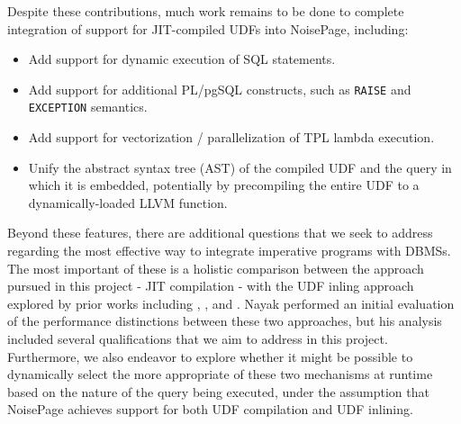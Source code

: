 \documentclass{vldb}
\def\code#1{\texttt{#1}}
\begin{document}
Despite these contributions, much work remains to be done to complete integration of support for JIT-compiled UDFs into NoisePage, including:

\begin{itemize}
    \item Add support for dynamic execution of SQL statements.
    \item Add support for additional PL/pgSQL constructs, such as \code{RAISE} and \code{EXCEPTION} semantics.
    \item Add support for vectorization / parallelization of TPL lambda execution.
    \item Unify the abstract syntax tree (AST) of the compiled UDF and the query in which it is embedded, potentially by precompiling the entire UDF to a dynamically-loaded LLVM function.
\end{itemize}

Beyond these features, there are additional questions that we seek to address regarding the most effective way to integrate imperative programs with DBMSs. The most important of these is a holistic comparison between the approach pursued in this project - JIT compilation - with the UDF inling approach explored by prior works including \cite{apfel}, \cite{froid}, and \cite{aggify}. Nayak \cite{tanuj} performed an initial evaluation of the performance distinctions between these two approaches, but his analysis included several qualifications that we aim to address in this project. Furthermore, we also endeavor to explore whether it might be possible to dynamically select the more appropriate of these two mechanisms at runtime based on the nature of the query being executed, under the assumption that NoisePage achieves support for both UDF compilation and UDF inlining.


\newcommand{\newblock}{}

\newpage
\balance


\end{document}
